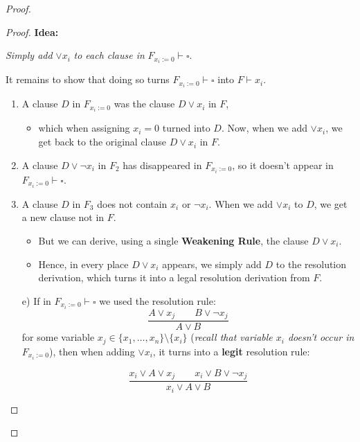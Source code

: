 \begin{proof}
\begin{proof}
\textbf{Idea:}

\begin{center}
\textit{Simply add} $ \lor x_i$ \textit{to each clause in} $F_{x_i := 0} \vdash \square$.
\end{center}
 

It remains to show that doing so turns  
$F_{x_i := 0} \vdash \square$ into $F \vdash x_i$.

\begin{enumerate}
    \item A clause $D$ in $F_{x_i := 0}$ was the clause $D \lor x_i$ in $F$,
    
    \begin{itemize}
        \item which when assigning $x_i = 0$ turned into $D$. Now, when we add $\lor x_i$, we get back to the original clause $D \lor x_i$ in $F$.
    \end{itemize}

    \item A clause $D \lor \neg x_i$ in $F_2$ has disappeared in $F_{x_i := 0}$, so it doesn’t appear in $F_{x_i := 0} \vdash \square$.

    \item A clause $D$ in $F_3$ does not contain $x_i$ or $\neg x_i$. When we add $\lor x_i$ to $D$, we get a new clause not in $F$.
    
    \begin{itemize}
        \item But we can derive, using a single \textbf{Weakening Rule}, the clause $D \lor x_i$.  
        \item Hence, in every place $D \lor x_i$ appears, we simply add $D$ to the resolution derivation, which turns it into a legal resolution derivation from $F$.
    \end{itemize}
\end{enumerate}

 

\begin{enumerate}
    \item[e)] If in $F_{x_i := 0} \vdash \square$ we used the resolution rule:
    \[
    \frac{A \lor x_j\qquad B\lor \neg x_j}{A \lor B} 
    \]
    for some variable $x_j \in \{x_1, \dots, x_n\} \setminus \{x_i\}$  
    (\textit{recall that variable $x_i$ doesn't occur in} $F_{x_i := 0}$),  
    then when adding $\lor x_i$, it turns into a \textbf{legit} resolution rule:

    \[
    \frac{
    x_i \lor A \lor x_j \qquad x_i \lor B \lor \neg x_j}{    x_i \lor A \lor B
 }   \]


\end{enumerate}
\end{proof}
\end{proof}
